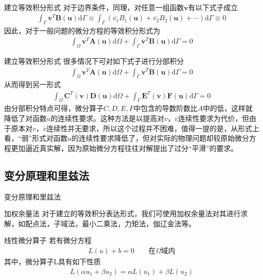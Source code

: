 \documentclass[11pt]{beamer}
\begin{document}
\begin{frame}{建立等效积分形式}
对于边界条件，同理，对任意一组函数$\overline{\textbf{v}}$有以下式子成立
\begin{align}
\int_\Gamma \overline{\textbf{v}}^T\textbf{B}(\textbf{u})\mathrm{d}\Gamma\equiv
\int_\Gamma (\overline{v_1} B_1(\textbf{u})+\overline{v_2} B_2(\textbf{u})+\cdots)\mathrm{d}\Gamma\equiv0
\label{边界条件积分形式}
\end{align}
因此，对于一般问题的微分方程的等效积分形式为
\begin{align}
\int_\Omega \textbf{v}^T\textbf{A}(\textbf{u})\mathrm{d}\Omega
+\int_\Gamma \overline{\textbf{v}}^T\textbf{B}(\textbf{u})\mathrm{d}\Gamma=0
\label{一般积分方程}
\end{align}
\end{frame}

\begin{frame}{建立等效积分形式}
很多情况下可对如下式子进行分部积分
\begin{align}
\int_\Omega \textbf{v}^T\textbf{A}(\textbf{u})\mathrm{d}\Omega
+\int_\Gamma \overline{\textbf{v}}^T\textbf{B}(\textbf{u})\mathrm{d}\Gamma=0
\label{一般积分方程}
\end{align}
从而得到另一形式
\begin{align}
\int_\Omega \textbf{C}^T(\textbf{v})\textbf{D}(\textbf{u})\mathrm{d}\Omega
+\int_\Gamma \textbf{E}^T(\overline{\textbf{v}})\textbf{F}(\textbf{u})\mathrm{d}\Gamma=0
\label{弱解形式}
\end{align}
由分部积分特点可得，微分算子$C,D,E,F$中包含的导数阶数比$A$中的低，这样就降低了对函数$u$的连续性要求。这种方法是以提高对$v，\overline{v}$连续性要求为代价，但由于原本对$v，\overline{v}$连续性并无要求，所以这个过程并不困难，值得一提的是，从形式上看，“弱”形式对函数$u$的连续性要求降低了，但对实际的物理问题却较原始微分方程更加逼近真实解，因为原始微分方程往往对解提出了过分“平滑”的要求。
\end{frame}

\subsection{变分原理和里兹法}
\begin{frame}{变分原理和里兹法}
\begin{block}{加权余量法}
对于建立的等效积分表达形式，我们可使用加权余量法对其进行求解，如配点法，子域法，最小二乘法，力矩法，伽辽金法等。
\end{block}
\begin{block}{线性微分算子}
若有微分方程
\begin{align*}
L(u)+b=0\qquad \text{在$\Omega$域内}
\end{align*}
其中，微分算子L具有如下性质
\begin{align*}
L(\alpha u_1+\beta u_2)=\alpha L(u_1)+\beta L(u_2)
\end{align*}
\end{block}
\end{frame}
\end{document}
